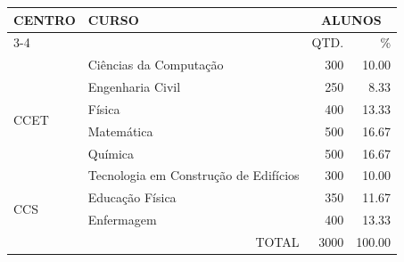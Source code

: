     \begin{board}[!htb]
        \small
        \centering
        \caption{Quantidade de alunos por curso}
        \label{brd:qtdalunos}
        \begin{tabular}{|l|l|r|r|} \hline
            \multirow{2}{*}{CENTRO} & \multirow{2}{*}{CURSO}                & \multicolumn{2}{c|}{ALUNOS} \\ \cline{3-4}
                                    &                                       & QTD.        & \%            \\ \hline
            \multirow{6}{*}{CCET}   & Ciências da Computação                & 300         &  10.00        \\ \cline{2-4}
                                    & Engenharia Civil                      & 250         &   8.33        \\ \cline{2-4}
                                    & Física                                & 400         &  13.33        \\ \cline{2-4}
                                    & Matemática                            & 500         &  16.67        \\ \cline{2-4}
                                    & Química                               & 500         &  16.67        \\ \cline{2-4}
                                    & Tecnologia em Construção de Edifícios & 300         &  10.00        \\ \hline
            \multirow{2}{*}{CCS}    & Educação Física                       & 350         &  11.67        \\ \cline{2-4}
                                    & Enfermagem                            & 400         &  13.33        \\ \hline
            \multicolumn{2}{|r|}{TOTAL}                                     & 3000        & 100.00        \\ \hline
        \end{tabular}
        \vspace{0.2cm}
    \end{board}